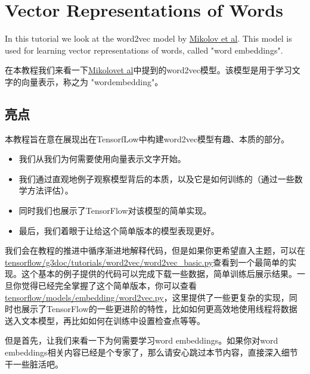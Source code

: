 
\section{Vector Representations of Words}\label{word2vec}

In this tutorial we look at the word2vec model by \href{http://papers.nips.cc/paper/5021-distributed-representations-of-words-and-phrases-and-their-compositionality.pdf}{Mikolov et al}. This model is used for learning vector representations of words, called "word embeddings".

在本教程我们来看一下\href{http://papers.nips.cc/paper/5021-distributed-representations-of-words-and-phrases-and-their-compositionality.pdf}{Mikolovet al}中提到的word2vec模型。该模型是用于学习文字的向量表示，称之为 "wordembedding"。

\subsection{亮点 }\label{word2vec_hl}

本教程旨在意在展现出在TensorfLow中构建word2vec模型有趣、本质的部分。

\begin{itemize}
\item 我们从我们为何需要使用向量表示文字开始。
\item 我们通过直观地例子观察模型背后的本质，以及它是如何训练的（通过一些数学方法评估）。
\item 同时我们也展示了TensorFlow对该模型的简单实现。
\item 最后，我们着眼于让给这个简单版本的模型表现更好。
\end{itemize}

我们会在教程的推进中循序渐进地解释代码，但是如果你更希望直入主题，可以在
\href{https://tensorflow.googlesource.com/tensorflow/+/master/tensorflow/g3doc/tutorials/word2vec/word2vec_basic.py}{tensorflow/g3doc/tutorials/word2vec/word2vec\_basic.py}查看到一个最简单的实现。这个基本的例子提供的代码可以完成下载一些数据，简单训练后展示结果。一旦你觉得已经完全掌握了这个简单版本，你可以查看
\href{https://tensorflow.googlesource.com/tensorflow/+/master/tensorflow/models/embedding/word2vec.py}{tensorflow/models/embedding/word2vec.py}，这里提供了一些更复杂的实现，同时也展示了TensorFlow的一些更进阶的特性，比如如何更高效地使用线程将数据送入文本模型，再比如如何在训练中设置检查点等等。

但是首先，让我们来看一下为何需要学习word embeddings。如果你对word
embeddings相关内容已经是个专家了，那么请安心跳过本节内容，直接深入细节干一些脏活吧。

